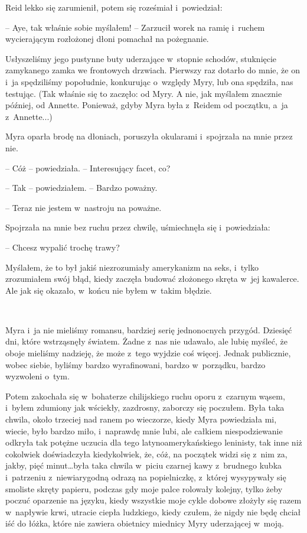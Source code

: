 \documentclass[oneside,polish,11pt,sfheadings]{mwbk}
\begin{document}
Reid lekko się zarumienił, potem się roześmiał i~powiedział: 

-- Aye, tak
właśnie sobie myślałem! -- Zarzucił worek na ramię i~ruchem wycierającym
rozłożonej dłoni pomachał na pożegnanie.

Usłyszeliśmy jego pustynne buty uderzające w~stopnie schodów, stuknięcie
zamykanego zamka we frontowych drzwiach. Pierwszy raz dotarło do mnie,
że on i~ja spędziliśmy popołudnie, konkurując o~względy Myry, lub ona
spędziła, nas testując. (Tak właśnie się to zaczęło: od Myry. A nie, jak
myślałem znacznie później, od Annette. Ponieważ, gdyby Myra była z~Reidem od początku, a~ja z~Annette...)

Myra oparła brodę na dłoniach, poruszyła okularami i~spojrzała na mnie
przez nie.

-- Cóż -- powiedziała. -- Interesujący facet, co?

-- Tak -- powiedziałem. -- Bardzo poważny.

-- Teraz nie jestem w~nastroju na poważne.

Spojrzała na mnie bez ruchu przez chwilę, uśmiechnęła się i~powiedziała:

-- Chcesz wypalić trochę trawy?

Myślałem, że to był jakiś niezrozumiały amerykanizm na seks, i~tylko
zrozumiałem swój błąd, kiedy zaczęła budować złożonego skręta w~jej
kawalerce. Ale jak się okazało, w~końcu nie byłem w~takim błędzie.

~

Myra i~ja nie mieliśmy romansu, bardziej serię jednonocnych przygód.
Dziesięć dni, które wstrząsnęły światem. Żadne z~nas nie udawało, ale
lubię myśleć, że oboje mieliśmy nadzieję, że może z~tego wyjdzie coś
więcej. Jednak publicznie, wobec siebie, byliśmy bardzo wyrafinowani,
bardzo w~porządku, bardzo wyzwoleni o~tym.

Potem zakochała się w~bohaterze chilijskiego ruchu oporu z~czarnym
wąsem, i~byłem zdumiony jak wściekły, zazdrosny, zaborczy się poczułem.
Była taka chwila, około trzeciej nad ranem po wieczorze, kiedy Myra
powiedziała mi, wiecie, było bardzo miło, i~naprawdę mnie lubi, ale
całkiem niespodziewanie odkryła tak potężne uczucia dla tego
latynoamerykańskiego leninisty, tak inne niż cokolwiek doświadczyła
kiedykolwiek, że, cóż, na początek widzi się z~nim za, jakby, pięć
minut\ldots była taka chwila w~piciu czarnej kawy z~brudnego kubka i~patrzeniu z~niewiarygodną odrazą na popielniczkę, z~której wysypywały
się smoliste skręty papieru, podczas gdy moje palce rolowały kolejny,
tylko żeby poczuć oparzenie na języku, kiedy wszystkie moje cykle dobowe
złożyły się razem w~napływie krwi, utracie ciepła ludzkiego, kiedy
czułem, że nigdy nie będę chciał iść do łóżka, które nie zawiera
obietnicy miednicy Myry uderzającej w~moją.
\end{document}
